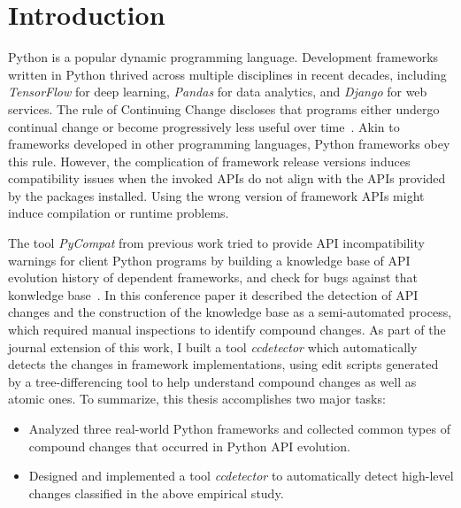 \chapter{Introduction}
\label{chap:introduction}

Python is a popular dynamic programming language. Development frameworks written in Python thrived across multiple disciplines in recent decades, including \textit{TensorFlow} for deep learning, \textit{Pandas} for data analytics, and \textit{Django} for web services. The rule of Continuing Change discloses that programs either undergo continual change or become progressively less useful over time~\cite{evo-laws}. Akin to frameworks developed in other programming languages, Python frameworks obey this rule. However, the complication of framework release versions induces compatibility issues when the invoked APIs do not align with the APIs provided by the packages installed. Using the wrong version of framework APIs might induce compilation or runtime problems.

The tool \textit{PyCompat} from previous work tried to provide API incompatibility warnings for client Python programs by building a knowledge base of API evolution history of dependent frameworks, and check for bugs against that konwledge base~\cite{DBLP:conf/wcre/ZhangZWTLX20}. In this conference paper it described the detection of API changes and the construction of the knowledge base as a semi-automated process, which required manual inspections to identify compound changes. As part of the journal extension of this work, I built a tool \textit{ccdetector} which automatically detects the changes in framework implementations, using edit scripts generated by a tree-differencing tool to help understand compound changes as well as atomic ones. To summarize, this thesis accomplishes two major tasks:

\begin{itemize}
  \item Analyzed three real-world Python frameworks and collected common types of compound changes that occurred in Python API evolution.
  \item Designed and implemented a tool \textit{ccdetector} to automatically detect high-level changes classified in the above empirical study.
\end{itemize}
